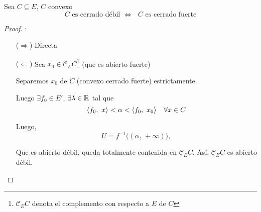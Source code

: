 \begin{thm}
Sea $C \subseteq E$, $C$ convexo
\begin{equation*}
    \text{$C$ es cerrado débil $\iff$ $C$ es cerrado fuerte}
\end{equation*}
\end{thm}

\begin{proof}:\\
\begin{itemize}
    \item[($\Rightarrow$)] Directa
    
    \item[($\Leftarrow$)] Sea $x_0\in \mathcal{C}_{E} C$\footnote{$\mathcal{C}_{E} C$ denota el complemento con respecto a $E$ de $C$} (que es abierto fuerte)
    
    Separemos $x_0$ de $C$ (convexo cerrado fuerte) estrictamente.
    
    Luego $\exists f_0 \in E'$, $\exists \lambda \in \rr$ tal que
    \begin{equation*}
        \prodint[]{f_0}{x} < \alpha < \prodint[]{f_0}{x_0} \quad \forall x \in C
    \end{equation*}
    
    Luego, 
    \begin{equation*}
        U = f^{-1}\big( (\alpha,\, + \infty) \big),
    \end{equation*}
    
    Que es abierto débil, queda totalmente contenida en $\mathcal{C}_E C$. Así, $\mathcal{C}_E C$ es abierto débil.
\end{itemize}
\end{proof}